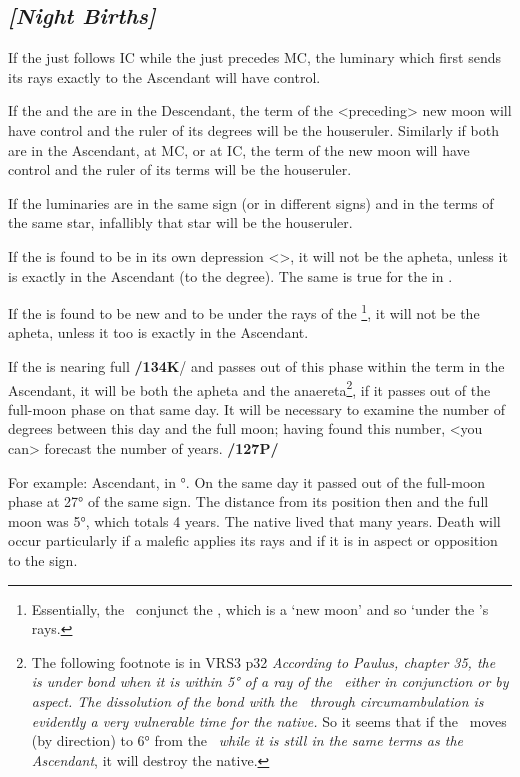 \subsection{\textit{[Night Births]}}

If the \Sun\xspace just follows IC while the \Moon\xspace just
precedes MC, the luminary which first sends its rays exactly to the Ascendant will have control. 

If the \Sun\xspace and the \Moon\xspace are in the Descendant, the term of the <preceding> new moon will have control and the ruler of its degrees will be the houseruler. Similarly if both are in the Ascendant, at MC, or at IC, the term of the new moon will have control and the ruler of its terms will be the houseruler. 

If the luminaries are in the same sign (or in different signs) and in the terms of the same star, infallibly that star will be the houseruler.

If the \Sun\xspace is found to be in its own depression <\Libra>, it will not be the apheta, unless it is exactly in
the Ascendant (to the degree). The same is true for the \Moon\xspace in \Scorpio\xspace <its depression>. 

If the \Moon\xspace is found to be new and to be under the rays of the \Sun\footnote{Essentially, the \Moon\, conjunct the \Sun, which is a `new moon' and so `under the \Sun's rays.}, it will not be the apheta, unless it too is exactly in the Ascendant.

If the \Moon\xspace is nearing full \textbf{/134K}/ and passes out of this phase within the term in the Ascendant, it will be both the apheta and the anaereta\footnote{The following footnote is in VRS3 p32 \textsl{According to Paulus, chapter 35, the \Moon\, is under bond when it is within 5° of a ray of the \Sun\, either in conjunction or by aspect. The dissolution of the bond with the \Sun\, through circumambulation is evidently a very vulnerable time for the native.} So it seems that if the \Moon\, moves (by direction) to 6° from the \Sun\, \textsl{while it is still in the same terms as the Ascendant}, it will destroy the native.}, if it passes out of the full-moon phase on that same day. It will be necessary to examine the number of degrees between this day and the full moon; having found this number, <you can> forecast the number of years. \textbf{/127P/}

For example: Ascendant, \Moon\xspace in °. On the same day it passed out of the full-moon phase at 27° of the same sign. The distance from its position then and the full moon was 5°, which totals 4 years. The native lived that many years. Death will occur particularly if a malefic applies its rays and if it is in aspect or opposition to the sign.

